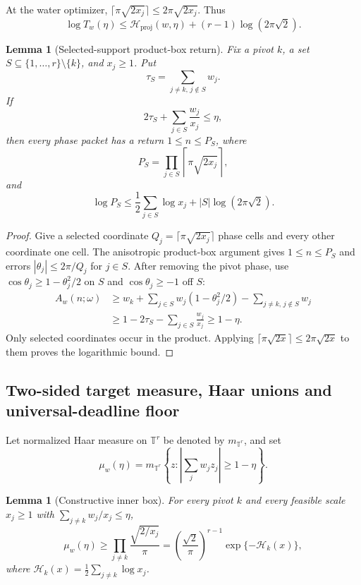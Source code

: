 \documentclass[10pt]{article}
\newtheorem{lemma}[theorem]{Lemma}
\theoremstyle{definition}
\newcommand{\T}{\mathbb T}
\newcommand{\proj}{\mathrm{proj}}
\newcommand{\Hwater}{\mathcal H}
\begin{document}
At the water optimizer,
\(\lceil\pi\sqrt{2x_j}\rceil\leq2\pi\sqrt{2x_j}\).  Thus
\[
 \log T_w(\eta)
 \leq\Hwater_{\proj}(w,\eta)+(r-1)\log(2\pi\sqrt2).
\]

\begin{lemma}[Selected-support product-box return]
\label{lem:selected-box}
Fix a pivot \(k\), a set
\(S\subseteq\{1,\ldots,r\}\setminus\{k\}\), and \(x_j\geq1\).
Put
\[
 \tau_S=\sum_{j\ne k,\,j\notin S}w_j.
\]
If
\[
 2\tau_S+\sum_{j\in S}\frac{w_j}{x_j}\leq\eta,
\]
then every phase packet has a return \(1\leq n\leq P_S\), where
\[
 P_S=\prod_{j\in S}\left\lceil\pi\sqrt{2x_j}\right\rceil,
\]
and
\[
 \log P_S\leq\frac12\sum_{j\in S}\log x_j
 +|S|\log(2\pi\sqrt2).
\]
\end{lemma}

\begin{proof}
Give a selected coordinate
\(Q_j=\lceil\pi\sqrt{2x_j}\rceil\) phase cells and every other coordinate
one cell.  The anisotropic product-box argument gives \(1\leq n\leq P_S\)
and errors \(|\theta_j|\leq2\pi/Q_j\) for \(j\in S\).  After removing the
pivot phase, use \(\cos\theta_j\geq1-\theta_j^2/2\) on \(S\) and
\(\cos\theta_j\geq-1\) off \(S\):
\[
\begin{aligned}
 A_w(n;\omega)
 &\geq w_k+\sum_{j\in S}w_j(1-\theta_j^2/2)
        -\sum_{j\ne k,\,j\notin S}w_j\\
 &\geq1-2\tau_S-\sum_{j\in S}\frac{w_j}{x_j}
 \geq1-\eta.
\end{aligned}
\]
Only selected coordinates occur in the product.  Applying
\(\lceil\pi\sqrt{2x}\rceil\leq2\pi\sqrt{2x}\) to them proves the logarithmic
bound.
\end{proof}

\subsection{Two-sided target measure, Haar unions and universal-deadline floor}

Let normalized Haar measure on \(\T^r\) be denoted by \(m_{\T^r}\), and set
\[
 \mu_w(\eta)=m_{\T^r}
 \left\{z:\left|\sum_jw_jz_j\right|\geq1-\eta\right\}.
\]

\begin{lemma}[Constructive inner box]
\label{lem:inner-box}
For every pivot \(k\) and every feasible scale \(x_j\geq1\) with
\(\sum_{j\ne k}w_j/x_j\leq\eta\),
\[
 \mu_w(\eta)\geq
 \prod_{j\ne k}\frac{\sqrt{2/x_j}}{\pi}
 =\left(\frac{\sqrt2}{\pi}\right)^{r-1}
   \exp\{-\Hwater_k(x)\},
\]
where \(\Hwater_k(x)=\frac12\sum_{j\ne k}\log x_j\).
\end{lemma}
\end{document}
